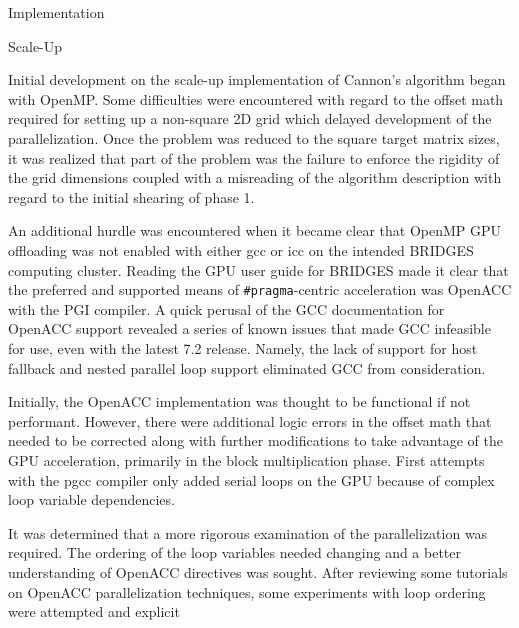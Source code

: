 \documentclass{article}
\begin{document}
\begin{section}{Implementation}
  \begin{subsection}{Scale-Up}
    \begin{paragraph}{}
      Initial development on the scale-up implementation of Cannon's algorithm began with OpenMP. Some difficulties were encountered with regard
      to the offset math required for setting up a non-square 2D grid which delayed development of the parallelization. Once the problem was
      reduced to the square target matrix sizes, it was realized that part of the problem was the failure to enforce the rigidity of the grid dimensions
      coupled with a misreading of the algorithm description with regard to the initial shearing of phase 1.
    \end{paragraph}
    \begin{paragraph}{}
      An additional hurdle was encountered when it became clear that OpenMP GPU offloading was not enabled with either gcc or icc on the intended
      BRIDGES computing cluster. Reading the GPU user guide for BRIDGES\autocite{BridgesGPUGuide} made it clear that the preferred and supported means of \texttt{\#pragma}-centric
      acceleration was OpenACC with the PGI compiler. A quick perusal of the GCC documentation for OpenACC support\autocite{gccOpenACC} revealed a series
      of known issues that made GCC infeasible for use, even with the latest 7.2 release. Namely, the lack of support for host fallback and nested
      parallel loop support eliminated GCC from consideration.
    \end{paragraph}
    \begin{paragraph}{}
      Initially, the OpenACC implementation was thought to be functional if not performant. However, there were additional logic errors in the
      offset math that needed to be corrected along with further modifications to take advantage of the GPU acceleration, primarily in the block
      multiplication phase. First attempts with the pgcc compiler only added serial loops on the GPU because of complex loop variable dependencies.
    \end{paragraph}
    \begin{paragraph}{}
      It was determined that a more rigorous examination of the parallelization was required. The ordering of the loop variables needed changing
      and a better understanding of OpenACC directives was sought.
      After reviewing some tutorials on OpenACC parallelization techniques\autocites{NoACCKernels,MMOptimizeOpenACC}, some experiments with loop ordering were attempted and explicit

\end{paragraph}
\end{subsection}
\end{section}
\end{document}
